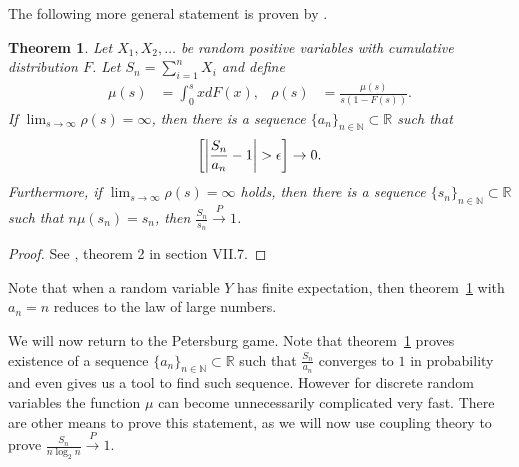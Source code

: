 \documentclass[twoside,a4paper]{article}
\theoremstyle{plain}
\newtheorem{theorem}{Theorem}[section]
\theoremstyle{definition}
\theoremstyle{remark}
\numberwithin{equation}{section}
\newcommand{\N}{\mathbb{N}}
\newcommand{\R}{\mathbb{R}}
\let\P\relax
\DeclareMathOperator{\P}{\mathbb{P}}
\DeclareMathOperator{\1}{\mathbbm{1}}
\begin{document}
The following more general statement is proven by \cite{Feller71}.
\begin{theorem}\label{thm:probavg}
Let $X_1,X_2,\ldots$ be random positive variables with cumulative distribution $F$. Let $S_n=\sum_{i=1}^n X_i$ and define
\begin{align*}
\mu(s)&=\int_0^sxdF(x),&\rho(s)&=\frac{\mu(s)}{s(1-F(s))}.
\end{align*}
If $\lim_{s\to\infty}\rho(s)=\infty$, then there is a sequence $\{a_n\}_{n\in\N}\subset\R$ such that
\[\P\left[\left|\frac{S_n}{a_n}-1\right|>\epsilon\right]\to0.\]
Furthermore, if $\lim_{s\to\infty}\rho(s)=\infty$ holds, then there is a sequence $\{s_n\}_{n\in\N}\subset\R$ such that $n\mu(s_n)=s_n$, then $\frac{S_n}{s_n}\stackrel{P}{\to}1$.
\end{theorem}
\begin{proof}
See \cite{Feller71}, theorem 2 in section VII.7.
\end{proof}
Note that when a random variable $Y$ has finite expectation, then theorem~\ref{thm:probavg} with $a_n=n$ reduces to the law of large numbers.

We will now return to the Petersburg game. Note that theorem~\ref{thm:probavg} proves existence of a sequence $\{a_n\}_{n\in\N}\subset\R$ such that $\frac{S_n}{a_n}$ converges to $1$ in probability and even gives us a tool to find such sequence. However for discrete random variables the function $\mu$ can become unnecessarily complicated very fast. There are other means to prove this statement, as we will now use coupling theory to prove $\frac{S_n}{n\log_2 n}\stackrel{P}{\to}1$.
\end{document}
